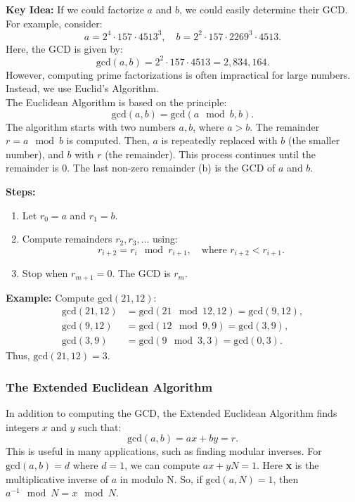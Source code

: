 \textbf{Key Idea:} If we could factorize \(a\) and \(b\), we could easily determine their GCD. For example, consider:
\[
a = 2^4 \cdot 157 \cdot 4513^3, \quad b = 2^2 \cdot 157 \cdot 2269^3 \cdot 4513.
\]
Here, the GCD is given by:
\[
\text{gcd}(a, b) = 2^2 \cdot 157 \cdot 4513 = 2{,}834{,}164.
\]
However, computing prime factorizations is often impractical for large numbers. Instead, we use Euclid's Algorithm. \\

The Euclidean Algorithm is based on the principle:
\[
\text{gcd}(a, b) = \text{gcd}(a \mod b, b).
\]
The algorithm starts with two numbers \(a,b\), where \(a > b\). The remainder \(r = a \mod b\) is computed. Then, \(a\) is repeatedly replaced with \(b\) (the smaller number), and \(b\) with \(r\) (the remainder). This process continues until the remainder is \(0\). The last non-zero remainder (b) is the GCD of \(a\) and \(b\).

\textbf{Steps:}
\begin{enumerate}
    \item Let \(r_0 = a\) and \(r_1 = b\).
    \item Compute remainders \(r_2, r_3, \dots\) using:
    \[
    r_{i+2} = r_i \mod r_{i+1}, \quad \text{where } r_{i+2} < r_{i+1}.
    \]
    \item Stop when \(r_{m+1} = 0\). The GCD is \(r_m\).
\end{enumerate}

\textbf{Example:}
Compute \(\text{gcd}(21, 12)\):
\[
\begin{aligned}
\text{gcd}(21, 12) &= \text{gcd}(21 \mod 12, 12) = \text{gcd}(9, 12), \\
\text{gcd}(9, 12) &= \text{gcd}(12 \mod 9, 9) = \text{gcd}(3, 9), \\
\text{gcd}(3, 9) &= \text{gcd}(9 \mod 3, 3) = \text{gcd}(0, 3).
\end{aligned}
\]
Thus, \(\text{gcd}(21, 12) = 3\).

\subsubsection{The Extended Euclidean Algorithm}
In addition to computing the GCD, the Extended Euclidean Algorithm finds integers \(x\) and \(y\) such that:
\[
\text{gcd}(a, b) = ax + by = r.
\]
This is useful in many applications, such as finding modular inverses. For \(
\text{gcd}(a, b) = d
\) where \(d = 1 \), we can compute \(ax + yN = 1 \). Here \textbf{x} is the multiplicative inverse of \(a\) in modulo N. So, if \(\text{gcd}(a, N) = 1\), then \(a^{-1} \mod N = x \mod N\). \\

